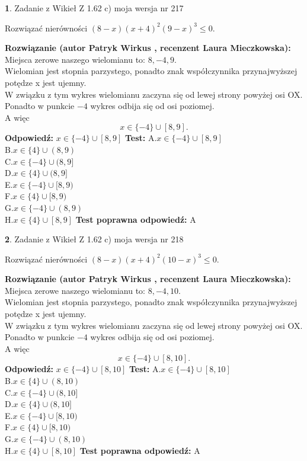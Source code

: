 \documentclass[12pt, a4paper]{article}
\theoremstyle{definition} %
\newtheorem{zad}{}
\newcommand{\zadStart}[1]{\begin{zad}#1\newline}
\newcommand{\zadStop}{\end{zad}}
\newcommand{\rozwStart}[2]{\noindent \textbf{Rozwiązanie (autor #1 , recenzent #2): }\newline}
\newcommand{\rozwStop}{\newline}
\newcommand{\odpStart}{\noindent \textbf{Odpowiedź:}\newline}
\newcommand{\odpStop}{\newline}
\newcommand{\testStart}{\noindent \textbf{Test:}\newline}
\newcommand{\testStop}{\newline}
\newcommand{\kluczStart}{\noindent \textbf{Test poprawna odpowiedź:}\newline}
\newcommand{\kluczStop}{\newline}
\begin{document}
\zadStart{Zadanie z Wikieł Z 1.62 c) moja wersja nr 217}

Rozwiązać nierówności $(8-x)(x+4)^{2}(9-x)^{3}\le0$.
\zadStop
\rozwStart{Patryk Wirkus}{Laura Mieczkowska}
Miejsca zerowe naszego wielomianu to: $8, -4, 9$.\\
Wielomian jest stopnia parzystego, ponadto znak współczynnika przy\linebreak najwyższej potędze x jest ujemny.\\ W związku z tym wykres wielomianu zaczyna się od lewej strony powyżej osi OX.\\
Ponadto w punkcie $-4$ wykres odbija się od osi poziomej.\\
A więc $$x \in \{-4\} \cup [8,9].$$
\rozwStop
\odpStart
$x \in \{-4\} \cup [8,9]$
\odpStop
\testStart
A.$x \in \{-4\} \cup [8,9]$\\
B.$x \in \{4\} \cup (8,9)$\\
C.$x \in \{-4\} \cup (8,9]$\\
D.$x \in \{4\} \cup (8,9]$\\
E.$x \in \{-4\} \cup [8,9)$\\
F.$x \in \{4\} \cup [8,9)$\\
G.$x \in \{-4\} \cup (8,9)$\\
H.$x \in \{4\} \cup [8,9]$
\testStop
\kluczStart
A
\kluczStop



\zadStart{Zadanie z Wikieł Z 1.62 c) moja wersja nr 218}

Rozwiązać nierówności $(8-x)(x+4)^{2}(10-x)^{3}\le0$.
\zadStop
\rozwStart{Patryk Wirkus}{Laura Mieczkowska}
Miejsca zerowe naszego wielomianu to: $8, -4, 10$.\\
Wielomian jest stopnia parzystego, ponadto znak współczynnika przy\linebreak najwyższej potędze x jest ujemny.\\ W związku z tym wykres wielomianu zaczyna się od lewej strony powyżej osi OX.\\
Ponadto w punkcie $-4$ wykres odbija się od osi poziomej.\\
A więc $$x \in \{-4\} \cup [8,10].$$
\rozwStop
\odpStart
$x \in \{-4\} \cup [8,10]$
\odpStop
\testStart
A.$x \in \{-4\} \cup [8,10]$\\
B.$x \in \{4\} \cup (8,10)$\\
C.$x \in \{-4\} \cup (8,10]$\\
D.$x \in \{4\} \cup (8,10]$\\
E.$x \in \{-4\} \cup [8,10)$\\
F.$x \in \{4\} \cup [8,10)$\\
G.$x \in \{-4\} \cup (8,10)$\\
H.$x \in \{4\} \cup [8,10]$
\testStop
\kluczStart
A
\kluczStop
\end{document}
